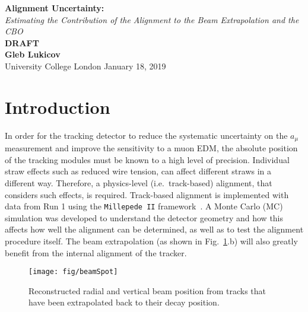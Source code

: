 \documentclass[a4paper,11pt]{article}
\begin{document}
\thispagestyle{empty}
\begin{titlepage}
\begin{center}
\end{center}
\begin{center}
    \vspace{1cm}
    {\huge \textbf{Alignment Uncertainty:} \\ \textit{Estimating the Contribution of the Alignment to the Beam Extrapolation and the CBO} }\\
    \vspace{1.5cm}
    {\Huge \textbf{ DRAFT }}\\
    \vspace{6cm}
    {\LARGE\bf Gleb Lukicov}\\
    {\Large University College London}
    \vspace{4cm}
    \vfill
    \vspace{0.9cm}
    {\large January 18, 2019}
\end{center}
\end{titlepage}
\clearpage

\thispagestyle{plain}

\clearpage
\section{Introduction}

In order for the tracking detector to reduce the systematic uncertainty on the $a_{\mu}$ measurement and improve the sensitivity to a muon EDM, the absolute position of the tracking modules must be known to a high level of precision. Individual straw effects such as reduced wire tension, can affect different straws in a different way. Therefore, a physics-level (i.e.~track-based) alignment, that considers such effects, is required. Track-based alignment is implemented with data from Run 1 using the \texttt{Millepede II} framework~\cite{mp2}. A Monte Carlo (MC) simulation was developed to understand the detector geometry and how this affects how well the alignment can be determined, as well as to test the alignment procedure itself. The beam extrapolation (as shown in Fig.~\ref{fig:beamSpot}.b) will also greatly benefit from the internal alignment of the tracker.
\begin{figure}[ht!]
    \centering
    \texttt{[image: fig/beamSpot]}
    \vspace{-8pt}
    \caption{Reconstructed radial and vertical beam position from tracks that have been extrapolated back to their decay position.}
    \label{fig:beamSpot}
\end{figure}
\end{document}
